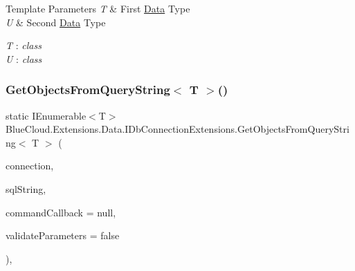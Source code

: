 \begin{DoxyTemplParams}{Template Parameters}
{\em T} & First \mbox{\hyperlink{namespace_blue_cloud_1_1_extensions_1_1_data}{Data}} Type\\
\hline
{\em U} & Second \mbox{\hyperlink{namespace_blue_cloud_1_1_extensions_1_1_data}{Data}} Type\\
\hline
\end{DoxyTemplParams}
\begin{Desc}
\item[Type Constraints]\begin{description}
\item[{\em T} : {\em class}]\item[{\em U} : {\em class}]\end{description}
\end{Desc}
\mbox{\label{class_blue_cloud_1_1_extensions_1_1_data_1_1_i_db_connection_extensions_adb831f47624e0f8d9cbf85346b804c8f}} 
\subsubsection{\texorpdfstring{Get\+Objects\+From\+Query\+String$<$ T $>$()}{GetObjectsFromQueryString< T >()}}
{\footnotesize\ttfamily static I\+Enumerable$<$T$>$ Blue\+Cloud.\+Extensions.\+Data.\+I\+Db\+Connection\+Extensions.\+Get\+Objects\+From\+Query\+String$<$ T $>$ (\begin{DoxyParamCaption}\item[{this I\+Db\+Connection}]{connection,  }\item[{string}]{sql\+String,  }\item[{Action$<$ I\+Db\+Command $>$}]{command\+Callback = {\ttfamily null},  }\item[{bool}]{validate\+Parameters = {\ttfamily false} }\end{DoxyParamCaption})\hspace{0.3cm}{\ttfamily [inline]}, {\ttfamily [static]}}



